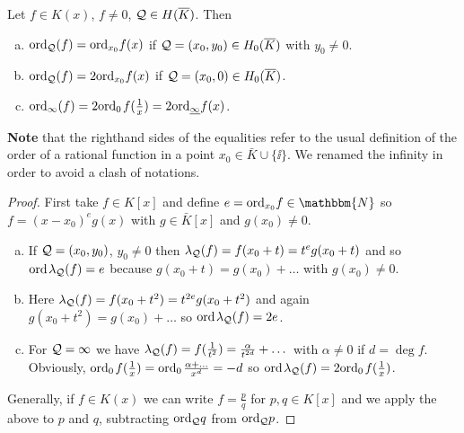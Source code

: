 \documentclass[english,11pt,a4paper]{article}
\begin{document}
\begin{lemma}\label{two}
  Let $f \in K(x)$, $f \neq 0$, $\mathcal{Q} \in H(\overline K)$. Then
  \begin{enumerate}[(a)]\parskip 1mm
	  \item $\text{ord}_{\mathcal{Q}} (f) = \text{ord}_{x_0} f(x)$ if $\mathcal{Q} = (x_0,y_0) \in H_0(\overline K)$ with $y_0 \neq 0$.
	  \item $\text{ord}_{\mathcal{Q}} (f) = 2 \text{ord}_{x_0} f(x)$ if $\mathcal{Q} = (x_0,0) \in H_0(\overline K)$.
	  \item $\text{ord}_{\infty} (f) = 2 \text{ord}_0\hspace{0.4mm} f(\frac{1}{x}) = 2 \text{ord}_{\underline{\infty}} f(x)$.
	\end{enumerate}\parskip 3mm
	\textbf{Note} that the righthand sides of the equalities refer to the usual definition of the order of a rational function in a point $x_0 \in \bar K \cup \{ \ii \}$. We renamed the infinity in order to avoid a clash of notations.
	\begin{proof}
		First take $f \in K[x]$ and define $e = \ordx f \in \mathbbm{N}$ so $f = (x-x_0)^e g(x)$ with $g \in \bar K[x]$ and $g(x_0)\neq 0$.
		\begin{enumerate}[(a)]
	  	\item If $\mathcal{Q} =(x_0,y_0)$, $y_0 \neq 0$ then $\lambda_{\mathcal{Q}} (f) = f(x_0 + t) = t^e g(x_0 + t)$ and so $\text{ord\hspace{0.4mm}} \lambda_{\mathcal{Q}} (f) = e$ because $g(x_0 + t) = g(x_0) + \dots$ with $g(x_0) \neq 0$.

	  	\item Here $\lambda_{\mathcal{Q}} (f) = f(x_0 + t^2) = t^{2e} g(x_0 + t^2)$ and again $g(x_0 + t^2) = g(x_0) + \dots$ so $\text{ord\hspace{0.4mm}} \lambda_{\mathcal{Q}} (f) = 2e$.

	  	\item For $\mathcal{Q} = \infty$ we have $\lambda_{\mathcal{Q}} (f) = f(\frac{1}{t^2}) = \frac{\alpha}{t^{2d}}+ \dots$ with $\alpha \neq 0$ if $d = \deg f$. Obviously, $\text{ord}_0\hspace{0.4mm} f(\frac 1 x ) = \text{ord}_0\hspace{0.4mm} \frac{\alpha + \dots}{x^d} = -d$ so $\text{ord\hspace{0.4mm}} \lambda_{\mathcal{Q}} (f) = 2 \text{ord}_0\hspace{0.4mm} f(\frac 1 x )$.
		\end{enumerate}
		Generally, if $f \in K(x)$ we can write $f = \frac p q$ for $p, q \in K[x]$ and we apply the above to $p$ and $q$, subtracting $\text{ord}_{\mathcal{Q}} q$ from $\text{ord}_{\mathcal{Q}} p$.
	\end{proof}
\end{lemma}
\end{document}
